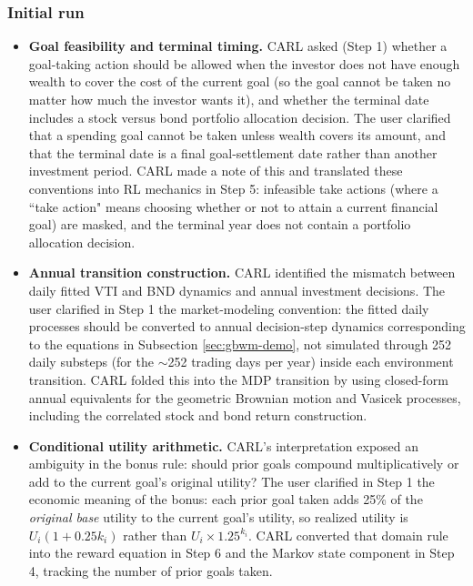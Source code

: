 \documentclass[mnsc,sglanonrev]{informs4}
\begin{document}
\subsubsection{Initial run}
%
\begin{itemize}

\item \textbf{Goal feasibility and terminal timing.} CARL asked (Step 1) whether a goal-taking action should be allowed when the investor does not have enough wealth to cover the cost of the current goal (so the goal cannot be taken no matter how much the investor wants it), and whether the terminal date includes a stock versus bond portfolio allocation decision. The user clarified that a spending goal cannot be taken unless wealth covers its amount, and that the terminal date is a final goal-settlement date rather than another investment period. CARL made a note of this and translated these conventions into RL mechanics in Step 5: infeasible take actions (where a ``take action" means choosing whether or not to attain a current financial goal) are masked, and the terminal year does not contain a portfolio allocation decision.

\item \textbf{Annual transition construction.} CARL identified the mismatch between daily fitted VTI and BND dynamics and annual investment decisions. The user clarified in Step 1 the market-modeling convention: the fitted daily processes should be converted to annual decision-step dynamics corresponding to the equations in Subsection \ref{sec:gbwm-demo}, not simulated through 252 daily substeps (for the $\sim$252 trading days per year) inside each environment transition. CARL folded this into the MDP transition by using closed-form annual equivalents for the geometric Brownian motion and Vasicek processes, including the correlated stock and bond return construction.

\item \textbf{Conditional utility arithmetic.} CARL's interpretation exposed an ambiguity in the bonus rule: should prior goals compound multiplicatively or add to the current goal's original utility? The user clarified in Step 1 the economic meaning of the bonus: each prior goal taken adds 25\% of the \emph{original base} utility to the current goal's utility, so realized utility is $U_i(1+0.25k_i)$ rather than $U_i\times 1.25^{k_i}$. CARL converted that domain rule into the reward equation in Step 6 and the Markov state component in Step 4, tracking the number of prior goals taken.


\end{itemize}
\end{document}
